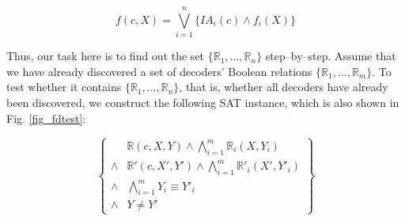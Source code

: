 \documentclass[journal]{IEEEtran}
\begin{document}
\begin{equation}\label{equ_fdfrewagain}
f(c,X)=\bigvee _{i=1}^{n} \{IA_i(c)\wedge f_i(X)\}
\end{equation}

%


Thus,
our task here is to find out the set $\{\mathbb{R}_1,\dots,\mathbb{R}_n\}$ step--by--step.
Assume that we have already discovered a set of decoders' Boolean relations $\{\mathbb{R}_1,\dots,\mathbb{R}_{m}\}$.
To test whether it contains $\{\mathbb{R}_1,\dots,\mathbb{R}_n\}$,
that is,
whether all decoders have already been discovered,
we construct the following SAT instance,
which is also shown in Fig. \ref{fig_fdtest}:



\begin{equation}\label{equ_fdtest}
\left\{
\begin{array}{cc}
      & \mathbb{R}(c,X,Y)\wedge \bigwedge_{i=1}^{m}\mathbb{R}_i(X,Y_i)  \\
\wedge& \mathbb{R}'(c,X',Y') \wedge \bigwedge_{i=1}^{m}\mathbb{R}'_i(X',Y'_i)  \\
\wedge&\bigwedge_{i=1}^{m}Y_i\equiv Y'_i\\
\wedge& Y\ne Y'
\end{array}
\right\}
\end{equation}
\end{document}

